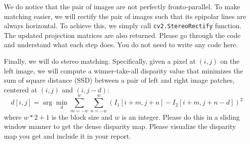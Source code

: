 \documentclass[11pt]{article}
\begin{document}
We do notice that the pair of images are not perfectly fronto-parallel. To make matching easier, we will rectify the pair of images such that its epipolar lines are always horizontal. To achieve this, we simply call \texttt{cv2.StereoRectify} function. The updated projection matrices are also returned. Please go through the code and understand what each step does. You do not need to write any code here. 

Finally, we will do stereo matching. Specifically, given a pixel at $(i, j)$ on the left image, we will compute a winner-take-all disparity value that minimizes the sum of square distance (SSD) between a pair of left and right image patches, centered at $(i, j)$ and $(i, j-d)$: 
\[
d[i, j] = \arg\min_d \sum_{m=-w}^{w} \sum_{n=-w}^{w} ( I_1[i+m, j+n] - I_2[i+m, j+n-d] )^2
\]
where $w*2+1$ is the block size and $w$ is an integer. Please do this in a sliding window manner to get the dense disparity map. Please visualize the disparity map you get and include it in your report.
\end{document}
